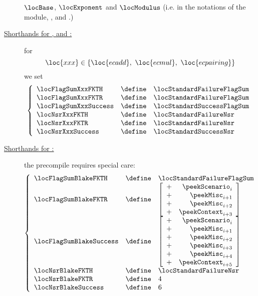 \begin{description}
		$\locBase$,
		$\locExponent$
		and $\locModulus$ (i.e. in the notations of the \oobMod{} module,
		\locBbs{},
		\locEbs{}
		and \locMbs{}.)
	\item[\underline{\underline{Shorthands for \inst{ECADD}, \inst{ECMUL} and \inst{ECPAIRING}:}}]
		for
		\[
			\loc{xxx} \in \left\{ \loc{ecadd}, ~ \loc{ecmul}, ~ \loc{ecpairing} \right\}
		\]
		we set
		\[
			\left\{ \begin{array}{lcl}
				\locFlagSumXxxFKTH    & \define & \locStandardFailureFlagSum \\
				\locFlagSumXxxFKTR    & \define & \locStandardFailureFlagSum \\
				\locFlagSumXxxSuccess & \define & \locStandardSuccessFlagSum \\
				\locNsrXxxFKTH        & \define & \locStandardFailureNsr     \\
				\locNsrXxxFKTR        & \define & \locStandardFailureNsr     \\
				\locNsrXxxSuccess     & \define & \locStandardSuccessNsr     \\
			\end{array} \right.
		\]
	\item[\underline{\underline{Shorthands for \inst{BLAKE2f}:}}] the  precompile requires special care:
		\[
			\left\{ \begin{array}{lcl}
				\locFlagSumBlakeFKTH        & \define & \locStandardFailureFlagSum \\
				\locFlagSumBlakeFKTR        & \define & 
				\left[ \begin{array}{cr}
					+ & \peekScenario _{i    } \\
					+ & \peekMisc     _{i + 1} \\
					+ & \peekMisc     _{i + 2} \\
					+ & \peekContext  _{i + 3} \\
				\end{array} \right] \\
				\locFlagSumBlakeSuccess     & \define & 
				\left[ \begin{array}{cr}
					+ & \peekScenario _{i    } \\
					+ & \peekMisc     _{i + 1} \\
					+ & \peekMisc     _{i + 2} \\
					+ & \peekMisc     _{i + 3} \\
					+ & \peekMisc     _{i + 4} \\
					+ & \peekContext  _{i + 5} \\
				\end{array} \right] \\
				\locNsrBlakeFKTH    & \define & \locStandardFailureNsr \\
				\locNsrBlakeFKTR    & \define & 4                      \\
				\locNsrBlakeSuccess & \define & 6                      \\
			\end{array} \right.
		\]
\end{description}
